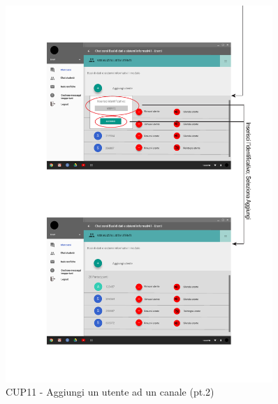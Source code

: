 \begin{figure}
	\centering
	\includegraphics[width=0.9\textwidth]{imgs/gruppo6/activities/act_cup11_aggiungi_utente_canale2.pdf}
	\caption{CUP11 - Aggiungi un utente ad un canale (pt.2)}
	\label{fig:cup11-2}
\end{figure}

